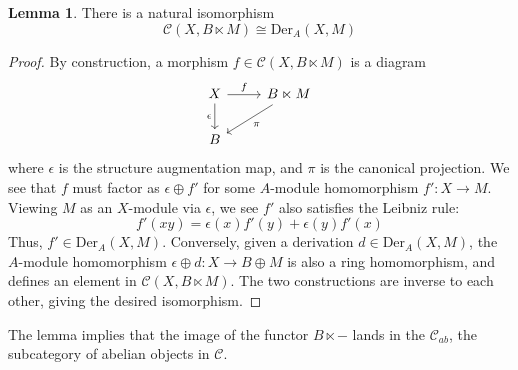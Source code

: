\documentclass{article}
\theoremstyle{definition}
\theoremstyle{definition}
\theoremstyle{definition}
\theoremstyle{definition}
\theoremstyle{definition}
\newtheorem{lemma}[theorem]{Lemma}
\theoremstyle{definition}
\theoremstyle{definition}
\begin{document}
\begin{lemma}
	\label{derivation_lemma}
	There is a natural isomorphism 
	\[\mathcal{C}(X, B\ltimes M)\cong \textrm{Der}_A(X,M)\]
\end{lemma}
\begin{proof}
	By construction, a morphism $f\in \mathcal{C}(X, B\ltimes M)$ is a diagram
\[\begin{tikzcd}
	X & {B\ltimes M} \\
	B
	\arrow["f", from=1-1, to=1-2]
	\arrow["\epsilon"', from=1-1, to=2-1]
	\arrow["\pi", from=1-2, to=2-1]
\end{tikzcd}\]
where $\epsilon$ is the structure augmentation map, and $\pi$ is the canonical projection. We see that $f$ must factor as $\epsilon\oplus f'$ for some $A$-module homomorphism $f': X\to M$.  Viewing $M$ as an $X$-module via $\epsilon$, we see $f'$ also satisfies the Leibniz rule:
\[f'(xy)= \epsilon(x)f'(y)+\epsilon(y)f'(x)\]
Thus, $f'\in \textrm{Der}_A(X,M)$. Conversely, given a derivation $d\in \textrm{Der}_A(X,M)$, the $A$-module homomorphism $\epsilon\oplus d: X\to B\oplus M$ is also a ring homomorphism, and defines an element in $\mathcal{C}(X, B\ltimes M)$. The two constructions are inverse to each other, giving the desired isomorphism.
\end{proof}

The lemma implies that the image of the functor $B\ltimes -$ lands in the  $\mathcal{C}_{ab}$, the subcategory of abelian objects in $\mathcal{C}$.
\end{document}
